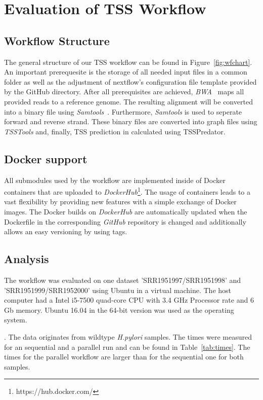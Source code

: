 \documentclass[twoside]{article}
\begin{document}
\section{Evaluation of TSS Workflow}
\subsection{Workflow Structure}
The general structure of our TSS workflow can be found in Figure~\ref{fig:wfchart}. An important prerequesite is the storage of all needed input files in a common folder as well as the adjustment of nextflow's configuration file template provided by the GitHub directory. After all prerequisites are achieved, \textit{BWA}~\cite{li2013aligning} maps all provided reads to a reference genome. The resulting alignment will be converted into a binary file using \textit{Samtools}~\cite{li2009sequence}. Furthermore, \textit{Samtools} is used to seperate forward and reverse strand. These binary files are converted into graph files using \textit{TSSTools} and, finally, TSS prediction in calculated using TSSPredator.

\subsection{Docker support}
All submodules used by the workflow are implemented inside of Docker containers that are uploaded to \textit{DockerHub}\footnote{https://hub.docker.com/}. The usage of containers leads to a vast flexibility by providing new features with a simple exchange of Docker images. The Docker builds on \textit{DockerHub} are automatically updated when the Dockerfile in the corresponding \textit{GitHub} repository is changed and additionally allows an easy versioning by using tags.

\subsection{Analysis}
The workflow was evaluated on one dataset 'SRR1951997/SRR1951998' and 'SRR1951999/SRR1952000' using Ubuntu in a virtual machine. The host computer had a Intel i5-7500 quad-core CPU with 3.4 GHz Processor rate and 6 Gb memory. Ubuntu 16.04 in the 64-bit version was used as the operating system.

%
. The data originates from wildtype \textit{H.pylori} samples. The times were measured for an sequential and a parallel run and can be found in Table~\ref{tab:times}. The times for the parallel workflow are larger than for the sequential one for both samples.
\end{document}
